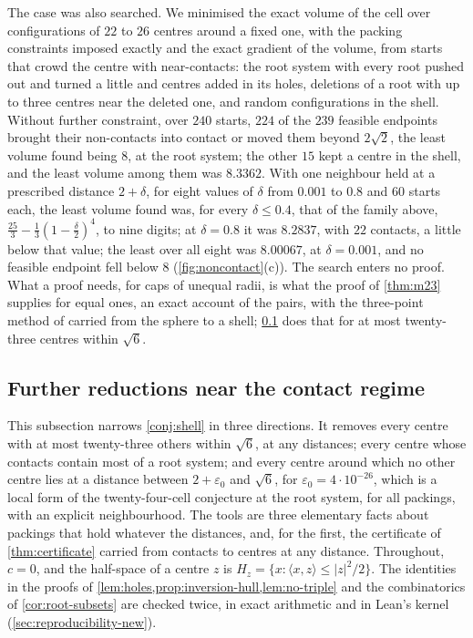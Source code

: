 \documentclass[11pt,reqno]{amsart}
\renewcommand{\_}{\origunderscore\allowbreak}
\numberwithin{equation}{section}
\theoremstyle{plain}
\theoremstyle{definition}
\theoremstyle{remark}
\begin{document}
The case was also searched. We minimised the exact volume of the cell
over configurations of $22$ to $26$ centres around a fixed one, with the
packing constraints imposed exactly and the exact gradient of the
volume, from starts that crowd the centre with near-contacts: the root
system with every root pushed out and turned a little and centres added
in its holes, deletions of a root with up to three centres near the
deleted one, and random configurations in the shell. Without further
constraint, over $240$ starts, $224$ of the $239$ feasible endpoints
brought their non-contacts into contact or moved them beyond $2\sqrt2$,
the least volume found being $8$, at the root system; the other $15$ kept
a centre in the shell, and the least volume among them was $8.3362$. With
one neighbour held at a prescribed distance $2+\delta$, for eight values
of $\delta$ from $0.001$ to $0.8$ and $60$ starts each, the least volume
found was, for every $\delta\le0.4$, that of the family above,
$\tfrac{25}3-\tfrac13(1-\tfrac\delta2)^4$, to nine digits; at
$\delta=0.8$ it was $8.2837$, with $22$ contacts, a little below that
value; the least over all eight was $8.00067$, at $\delta=0.001$, and no
feasible endpoint fell below $8$ (\cref{fig:noncontact}(c)). The search
enters no proof. What a proof needs, for caps of unequal
radii, is what the proof of \cref{thm:m23} supplies for equal ones, an
exact account of the pairs, with the three-point method of \cite{BV08}
carried from the sphere to a shell; \cref{sec:closure} does that for at
most twenty-three centres within $\sqrt6$.

\subsection{Further reductions near the contact regime}\label{sec:closure}

This subsection narrows \cref{conj:shell} in three directions. It
removes every centre with at most twenty-three others within $\sqrt6$,
at any distances; every centre whose contacts contain most of a root
system; and every centre around which no other centre lies at a distance
between $2+\varepsilon_0$ and $\sqrt6$, for $\varepsilon_0=4\cdot10^{-26}$,
which is a local form of the twenty-four-cell conjecture at the root
system, for all packings, with an explicit neighbourhood. The tools are three
elementary facts about packings that hold whatever the distances, and,
for the first, the certificate of \cref{thm:certificate} carried from
contacts to centres at any distance. Throughout, $c=0$, and the half-space of a centre $z$ is
$H_z=\{x:\langle x,z\rangle\le|z|^2/2\}$. The identities in the proofs of
\cref{lem:holes,prop:inversion-hull,lem:no-triple} and the combinatorics
of \cref{cor:root-subsets} are checked twice, in exact arithmetic and in Lean's kernel
(\cref{sec:reproducibility-new}).
\end{document}
